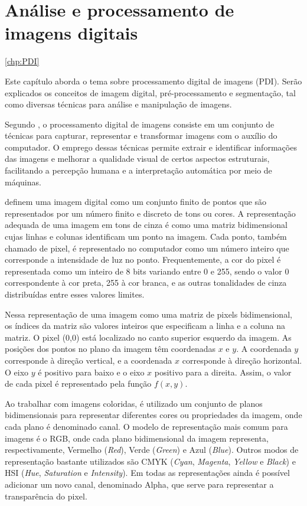 \documentclass[12pt,oneside,a4paper,english,french,spanish,brazil,]{abntex2}
\begin{document}
\chapter{Análise e processamento de imagens digitais}
\ref{chp:PDI}

Este capítulo aborda o tema sobre processamento digital de imagens (PDI). Serão explicados os conceitos de imagem digital, pré-processamento e segmentação, tal como diversas técnicas para análise e manipulação de imagens.

Segundo \citet{pedrini:2008}, o processamento digital de imagens consiste em um conjunto de técnicas para capturar, representar e transformar imagens com o auxílio do computador. O emprego dessas técnicas permite extrair e identificar informações das imagens e melhorar a qualidade visual de certos aspectos estruturais, facilitando a percepção humana e a interpretação automática por meio de máquinas. 

\citet{conci:2003} definem uma imagem digital como um conjunto finito de pontos que são representados por um número finito e discreto de tons ou cores. A representação adequada de uma imagem em tons de cinza é como uma matriz bidimensional cujas linhas e colunas identificam um ponto na imagem. Cada ponto, também chamado de pixel, é representado no computador como um número inteiro que corresponde a intensidade de luz no ponto. Frequentemente, a cor do pixel é representada como um inteiro de 8 bits variando entre 0 e 255, sendo o valor 0 correspondente à cor preta, 255 à cor branca, e as outras tonalidades de cinza distribuídas entre esses valores limites.

Nessa representação de uma imagem como uma matriz de pixels bidimensional, os índices da matriz são valores inteiros que especificam a linha e a coluna na matriz. O pixel (0,0) está localizado no canto superior esquerdo da imagem. As posições dos pontos no plano da imagem têm coordenadas \(x\) e \(y\). A coordenada \(y\) corresponde à direção vertical, e a coordenada \(x\) corresponde à direção horizontal. O eixo \(y\) é positivo para baixo e o eixo \(x\) positivo para a direita. Assim, o valor de cada pixel é representado pela função \(f(x,y)\).

Ao trabalhar com imagens coloridas, é utilizado um conjunto de planos bidimensionais para representar diferentes cores ou propriedades da imagem, onde cada plano é denominado canal. O modelo de representação mais comum para imagens é o RGB, onde cada plano bidimensional da imagem representa, respectivamente, Vermelho (\textit{Red}), Verde (\textit{Green}) e Azul (\textit{Blue}). Outros modos de representação bastante utilizados são CMYK (\textit{Cyan}, \textit{Magenta}, \textit{Yellow} e \textit{Black}) e HSI (\textit{Hue}, \textit{Saturation} e \textit{Intensity}). Em todas as representações ainda é possível adicionar um novo canal, denominado Alpha, que serve para representar a transparência do pixel.
\end{document}
